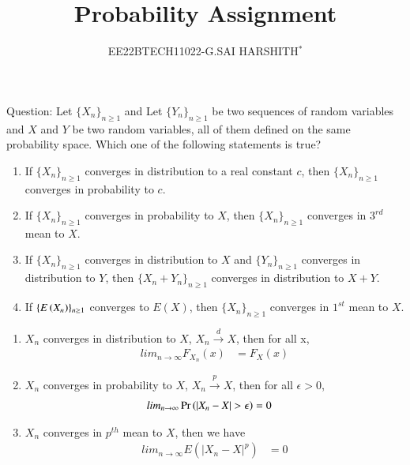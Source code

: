 \documentclass[journal,12pt,twocolumn]{IEEEtran}
\theoremstyle{remark}
\begin{document}

\vspace{3cm}

\title{Probability Assignment}
\author{EE22BTECH11022-G.SAI HARSHITH$^{*}$%
}
\maketitle
\newpage
\bigskip
\renewcommand{\thefigure}{\theenumi}
\renewcommand{\thetable}{\theenumi}

Question: Let $\{X_n\}_{n \geq 1}$ and Let $\{Y_n\}_{n \geq 1}$ be two sequences of random variables and $X$ and $Y$
be two random variables, all of them defined on the same probability space.
Which one of the following statements is true?
\begin{enumerate}[label=(\Alph*)]
\item If $\{X_n\}_{n \geq 1}$ converges in distribution to a real constant $c$, then $\{X_n\}_{n \geq 1}$
converges in probability to $c$.
\item If $\{X_n\}_{n \geq 1}$ converges in probability to $X$, then $\{X_n\}_{n \geq 1}$ converges in $3^{rd}$ mean
to $X$.
\item If $\{X_n\}_{n \geq 1}$ converges in distribution to $X$ and $\{Y_n\}_{n \geq 1}$ converges in
distribution to $Y$, then $\{X_n + Y_n\}_{n \geq 1}$ converges in distribution to $X+Y$.
\item If $\{E\left(X_n\right)\}_{n \geq 1}$ converges to $E(X)$, then $\{X_n\}_{n \geq 1}$ converges in $1^{st}$ mean to $X$.
\end{enumerate}
\fi
\solution 
\begin{enumerate}
\item $X_n$ converges in distribution to $X$, $X_n \xrightarrow{d} X$, then for all x,
\begin{align}
lim_{n \to \infty} F_{X_n}(x) &= F_X(x)
\end{align}
\item $X_n$ converges in probability to $X$, $X_n \xrightarrow{p} X$, then for all $\epsilon > 0$,
\begin{align}
lim_{n \to \infty} \pr{|X_n-X|>\epsilon}&=0
\label{eq:1}
\end{align}
\item $X_n$ converges in $p^{th}$ mean to $X$, then we have
\begin{align}
lim_{n \to \infty} E(|X_n-X|^p)&=0
\end{align}
\end{enumerate}
\end{document}
